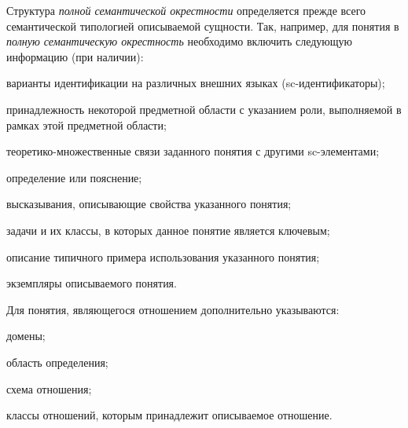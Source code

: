 \bigskip
Структура \textit{полной семантической окрестности} определяется прежде всего семантической типологией описываемой сущности. Так, например, для понятия в \textit{полную семантическую окрестность} необходимо включить следующую информацию (при наличии):
\begin{textitemize}
	\item{варианты идентификации на различных внешних языках (sc-идентификаторы)};
	\item{принадлежность некоторой предметной области с указанием роли, выполняемой в рамках этой предметной области};
	\item{теоретико-множественные связи заданного понятия с другими sc-элементами};
	\item{определение или пояснение};
	\item{высказывания, описывающие свойства указанного понятия};
	\item{задачи и их классы, в которых данное понятие является ключевым};
	\item{описание типичного примера использования указанного понятия};
	\item{экземпляры описываемого понятия}.
\end{textitemize}

Для понятия, являющегося отношением дополнительно указываются:

\begin{textitemize}
	\item{домены};
	\item{область определения};
	\item{схема отношения};
	\item{классы отношений, которым принадлежит описываемое отношение}.
\end{textitemize}

\begin{SCn}
\end{SCn}

